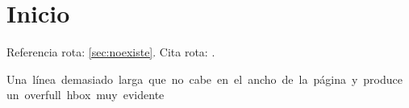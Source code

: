 \documentclass{article}
\begin{document}
\section{Inicio}\label{sec:inicio}
Referencia rota: \ref{sec:noexiste}. Cita rota: \cite{nadie2020}.



\noindent\hbox{Una línea demasiado larga que no cabe en el ancho de la página y produce un overfull hbox muy evidente}
\end{document}
